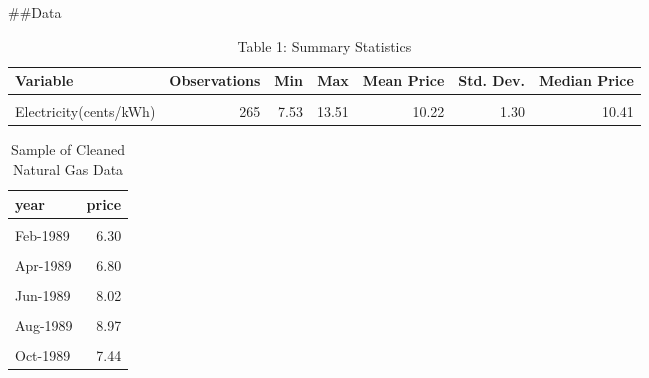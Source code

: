 \documentclass[
]{article}
\begin{document}
\#\#Data

\begin{table}[!h]

\caption{\label{tab:unnamed-chunk-1}Table 1: Summary Statistics}
\centering
\begin{tabular}[t]{l|r|r|r|r|r|r}
\hline
Variable & Observations & Min & Max & Mean Price & Std. Dev. & Median Price\\
\hline
\cellcolor{gray!6}{Natural Gas (\$/Mcf)} & \cellcolor{gray!6}{410} & \cellcolor{gray!6}{5.54} & \cellcolor{gray!6}{30.43} & \cellcolor{gray!6}{13.78} & \cellcolor{gray!6}{5.64} & \cellcolor{gray!6}{12.54}\\
\hline
Electricity(cents/kWh) & 265 & 7.53 & 13.51 & 10.22 & 1.30 & 10.41\\
\hline
\end{tabular}
\end{table}

\begin{table}[!h]

\caption{\label{tab:unnamed-chunk-2}Sample of Cleaned Natural Gas Data}
\begin{tabular}[t]{l|r}
\hline
year & price\\
\hline
\cellcolor{gray!6}{Jan-1989} & \cellcolor{gray!6}{6.17}\\
\hline
Feb-1989 & 6.30\\
\hline
\cellcolor{gray!6}{Mar-1989} & \cellcolor{gray!6}{6.29}\\
\hline
Apr-1989 & 6.80\\
\hline
\cellcolor{gray!6}{May-1989} & \cellcolor{gray!6}{6.99}\\
\hline
Jun-1989 & 8.02\\
\hline
\cellcolor{gray!6}{Jul-1989} & \cellcolor{gray!6}{8.71}\\
\hline
Aug-1989 & 8.97\\
\hline
\cellcolor{gray!6}{Sep-1989} & \cellcolor{gray!6}{8.68}\\
\hline
Oct-1989 & 7.44\\
\hline
\end{tabular}
\end{table}
\end{document}
